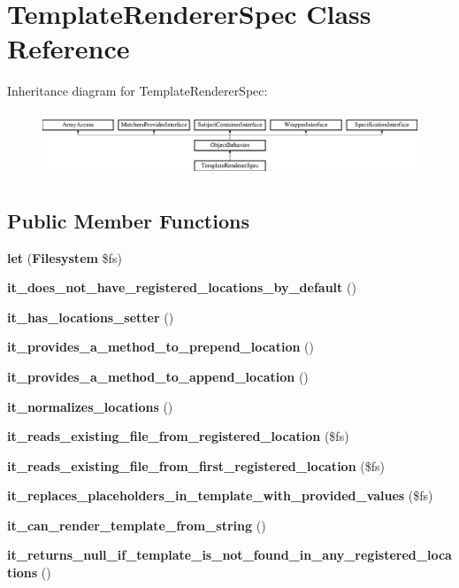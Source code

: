 \section{Template\+Renderer\+Spec Class Reference}
\label{classspec_1_1_php_spec_1_1_code_generator_1_1_template_renderer_spec}
Inheritance diagram for Template\+Renderer\+Spec\+:\begin{figure}[H]
\begin{center}
\leavevmode
\includegraphics[height=1.953488cm]{classspec_1_1_php_spec_1_1_code_generator_1_1_template_renderer_spec}
\end{center}
\end{figure}
\subsection*{Public Member Functions}
\begin{DoxyCompactItemize}
\item 
{\bf let} ({\bf Filesystem} \$fs)
\item 
{\bf it\+\_\+does\+\_\+not\+\_\+have\+\_\+registered\+\_\+locations\+\_\+by\+\_\+default} ()
\item 
{\bf it\+\_\+has\+\_\+locations\+\_\+setter} ()
\item 
{\bf it\+\_\+provides\+\_\+a\+\_\+method\+\_\+to\+\_\+prepend\+\_\+location} ()
\item 
{\bf it\+\_\+provides\+\_\+a\+\_\+method\+\_\+to\+\_\+append\+\_\+location} ()
\item 
{\bf it\+\_\+normalizes\+\_\+locations} ()
\item 
{\bf it\+\_\+reads\+\_\+existing\+\_\+file\+\_\+from\+\_\+registered\+\_\+location} (\$fs)
\item 
{\bf it\+\_\+reads\+\_\+existing\+\_\+file\+\_\+from\+\_\+first\+\_\+registered\+\_\+location} (\$fs)
\item 
{\bf it\+\_\+replaces\+\_\+placeholders\+\_\+in\+\_\+template\+\_\+with\+\_\+provided\+\_\+values} (\$fs)
\item 
{\bf it\+\_\+can\+\_\+render\+\_\+template\+\_\+from\+\_\+string} ()
\item 
{\bf it\+\_\+returns\+\_\+null\+\_\+if\+\_\+template\+\_\+is\+\_\+not\+\_\+found\+\_\+in\+\_\+any\+\_\+registered\+\_\+locations} ()
\end{DoxyCompactItemize}
